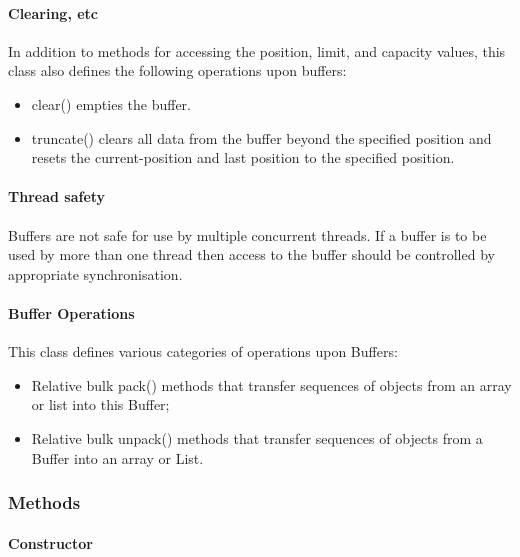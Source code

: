 \documentclass[$Date: 2003/06/26 19:29:31 $]{glabarticle}
\begin{document}
\paragraph{Clearing, etc} 


In addition to methods for accessing the position, limit, and capacity
values, this class also defines the following operations upon buffers:

\begin{itemize}
\item clear() empties the buffer.
\item truncate() clears all data from the buffer beyond the specified
  position and resets the current-position and last position to the
  specified position.
\end{itemize}

\paragraph{Thread safety} 

Buffers are not safe for use by multiple concurrent threads. If a
buffer is to be used by more than one thread then access to the buffer
should be controlled by appropriate synchronisation.

\paragraph{Buffer Operations} 

This class defines various categories of operations upon Buffers:   

\begin{itemize}
\item Relative bulk pack() methods that transfer sequences of objects
  from an array or list into this Buffer;
\item Relative bulk unpack() methods that transfer sequences of
  objects from a Buffer into an array or List.
\end{itemize}


\subsubsection{Methods}

\paragraph{Constructor}
\end{document}
